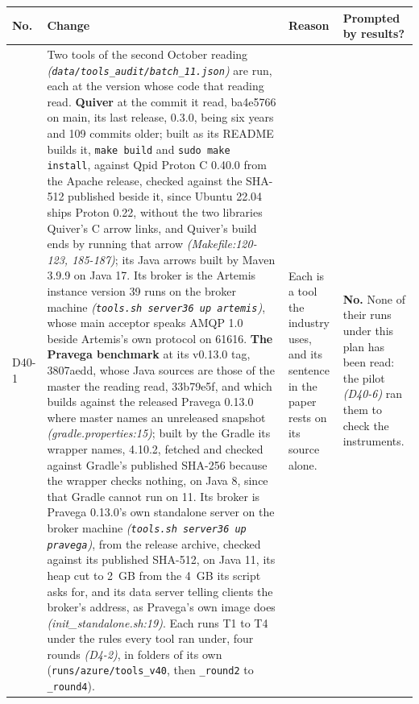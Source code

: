 \documentclass[11pt]{article}
\newcommand{\gl}[1]{{\color{soft}\itshape\small (#1)}}
\begin{document}
{\small
\begin{longtable}{@{}p{1.1cm} >{\raggedright\arraybackslash}p{6.1cm} >{\raggedright\arraybackslash}p{6.0cm} >{\raggedright\arraybackslash}p{2.2cm}@{}}
\toprule
\textbf{No.} & \textbf{Change} & \textbf{Reason} & \textbf{Prompted by results?} \\
\midrule
\endhead
D40-1 & Two tools of the second October reading \gl{\texttt{data/tools\_audit/batch\_11.json}} are run, each at the version whose code that reading read. \textbf{Quiver} at the commit it read, ba4e5766 on main, its last release, 0.3.0, being six years and 109 commits older; built as its README builds it, \texttt{make build} and \texttt{sudo make install}, against Qpid Proton C 0.40.0 from the Apache release, checked against the SHA-512 published beside it, since Ubuntu 22.04 ships Proton 0.22, without the two libraries Quiver's C arrow links, and Quiver's build ends by running that arrow \gl{Makefile:120-123, 185-187}; its Java arrows built by Maven 3.9.9 on Java 17. Its broker is the Artemis instance version 39 runs on the broker machine \gl{\texttt{tools.sh server36 up artemis}}, whose main acceptor speaks AMQP 1.0 beside Artemis's own protocol on 61616. \textbf{The Pravega benchmark} at its v0.13.0 tag, 3807aedd, whose Java sources are those of the master the reading read, 33b79e5f, and which builds against the released Pravega 0.13.0 where master names an unreleased snapshot \gl{gradle.properties:15}; built by the Gradle its wrapper names, 4.10.2, fetched and checked against Gradle's published SHA-256 because the wrapper checks nothing, on Java 8, since that Gradle cannot run on 11. Its broker is Pravega 0.13.0's own standalone server on the broker machine \gl{\texttt{tools.sh server36 up pravega}}, from the release archive, checked against its published SHA-512, on Java 11, its heap cut to 2~GB from the 4~GB its script asks for, and its data server telling clients the broker's address, as Pravega's own image does \gl{init\_standalone.sh:19}. Each runs T1 to T4 under the rules every tool ran under, four rounds \gl{D4-2}, in folders of its own (\texttt{runs/azure/tools\_v40}, then \texttt{\_round2} to \texttt{\_round4}). & Each is a tool the industry uses, and its sentence in the paper rests on its source alone. & \textbf{No.} None of their runs under this plan has been read: the pilot \gl{D40-6} ran them to check the instruments. \\

\end{longtable}}
\end{document}
